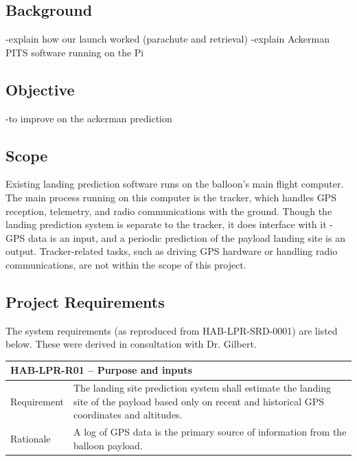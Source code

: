 \documentclass[11pt]{article}
\begin{document}
\subsection{Background}

-explain how our launch worked (parachute and retrieval)
-explain Ackerman PITS software running on the Pi

\subsection{Objective}
-to improve on the ackerman prediction

\subsection{Scope}

Existing landing prediction software runs on the balloon's main flight computer. The main process running on this computer is the tracker, which handles GPS reception, telemetry, and radio communications with the ground. Though the landing prediction system is separate to the tracker, it does interface with it - GPS data is an input, and a periodic prediction of the payload landing site is an output. Tracker-related tasks, such as driving GPS hardware or handling radio communications, are not within the scope of this project.



\subsection{Project Requirements}

The system requirements (as reproduced from HAB-LPR-SRD-0001) are listed below. These were derived in consultation with Dr. Gilbert.

\FloatBarrier

\begin{table}[!htbp] \centering
 \begin{tabular}{|p{2cm} p{11cm}|}
 \hline
  \multicolumn{2}{|l|}{HAB-LPR-R01 – Purpose and inputs} \\
  \hline
  Requirement & The landing site prediction system shall estimate the landing site of the payload based only on recent and historical GPS coordinates and altitudes. \\
  \hline
  Rationale & A log of GPS data is the primary source of information from the balloon payload.  \\
  \hline
 \end{tabular}
\end{table}
\end{document}
